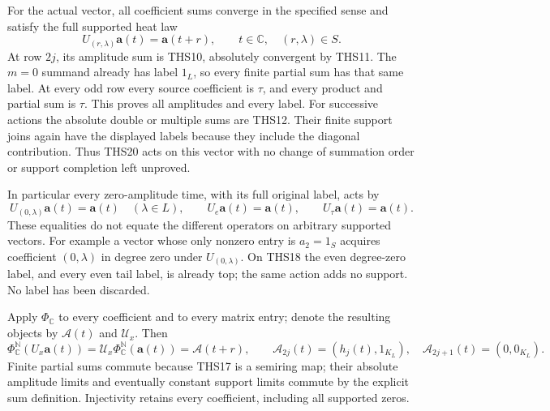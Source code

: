 For the actual vector, all coefficient sums converge in the
specified sense and satisfy the full supported heat law
\begin{equation}\tag{THS21}
 U_{(r,\lambda)}\mathbf a(t)=\mathbf a(t+r),
 \qquad t\in\mathbb C,\quad(r,\lambda)\in S.
\end{equation}
At row $2j$, its amplitude sum is THS10, absolutely convergent
by THS11. The $m=0$ summand already has label $1_L$, so every
finite partial sum has that same label. At every odd row every
source coefficient is $\tau$, and every product and partial sum
is $\tau$. This proves all amplitudes and every label.
For successive actions the absolute double or multiple sums
are THS12. Their finite support joins again have the displayed
labels because they include the diagonal contribution. Thus
THS20 acts on this vector with no change of summation order or
support completion left unproved.

In particular every zero-amplitude time, with its full original
label, acts by
\begin{equation}\tag{THS22}
 U_{(0,\lambda)}\mathbf a(t)=\mathbf a(t)
 \quad(\lambda\in L),\qquad
 U_e\mathbf a(t)=\mathbf a(t),\qquad U_\tau\mathbf a(t)=\mathbf a(t).
\end{equation}
These equalities do not equate the different operators on
arbitrary supported vectors. For example a vector whose only
nonzero entry is $a_2=1_S$ acquires coefficient $(0,\lambda)$
in degree zero under $U_{(0,\lambda)}$. On THS18 the even
degree-zero label, and every even tail label, is already top;
the same action adds no support. No label has been discarded.

Apply $\Phi_{\mathbb C}$ to every coefficient and to every
matrix entry; denote the resulting objects by
$\boldsymbol{\mathcal A}(t)$ and $\mathcal U_x$. Then
\begin{equation}\tag{THS23}
 \Phi_{\mathbb C}^{\mathbb N}(U_x\mathbf a(t))
   =\mathcal U_x\Phi_{\mathbb C}^{\mathbb N}(\mathbf a(t))
   =\boldsymbol{\mathcal A}(t+r),\qquad
 \mathcal A_{2j}(t)=(h_j(t),1_{K_L}),\quad
 \mathcal A_{2j+1}(t)=(0,0_{K_L}).
\end{equation}
Finite partial sums commute because THS17 is a semiring map;
their absolute amplitude limits and eventually constant support
limits commute by the explicit sum definition. Injectivity
retains every coefficient, including all supported zeros.

